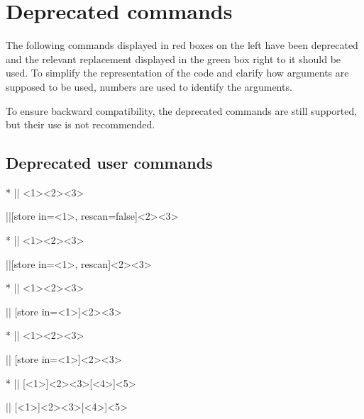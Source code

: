 \documentclass[a4paper]{article}
\begin{document}
{{\section{Deprecated commands}

The following commands displayed in red boxes on the left have been deprecated and the relevant replacement displayed in the green box right to it should be used. To simplify the representation of the code and clarify how arguments are supposed to be used, numbers are used to identify the arguments.

To ensure backward compatibility, the deprecated commands are still supported, but their use is not recommended.

\subsection{Deprecated user commands}

\begin{macrodeprecated}*
|\JSONParseSetValue|
  {<1>}{<2>}{<3>}
\end{macrodeprecated}
\hfill
\begin{macroreplacement}
|\JSONParseValue|[store in={<1>},
  rescan=false]{<2>}{<3>}
\end{macroreplacement}

\begin{macrodeprecated}*
|\JSONParseSetRescanValue|
  {<1>}{<2>}{<3>}
\end{macrodeprecated}
\hfill
\begin{macroreplacement}
|\JSONParseValue|[store in={<1>},
  rescan]{<2>}{<3>}
\end{macroreplacement}

\begin{macrodeprecated}*
|\JSONParseSetKeys|
  {<1>}{<2>}{<3>}
\end{macrodeprecated}
\hfill
\begin{macroreplacement}
|\JSONParseKeys|
  [store in={<1>}]{<2>}{<3>}
\end{macroreplacement}

\begin{macrodeprecated}*
|\JSONParseSetArrayCount|
  {<1>}{<2>}{<3>}
\end{macrodeprecated}
\hfill
\begin{macroreplacement}
|\JSONParseArrayCount|
  [store in={<1>}]{<2>}{<3>}
\end{macroreplacement}

\begin{macrodeprecated}*
|\JSONParseArrayValues|
  [<1>]{<2>}{<3>}[<4>]{<5>}
\end{macrodeprecated}
\hfill
\begin{macroreplacement}
|\JSONParseArrayUse|
  [<1>]{<2>}{<3>}[<4>]{<5>}
\end{macroreplacement}

}}
\end{document}
